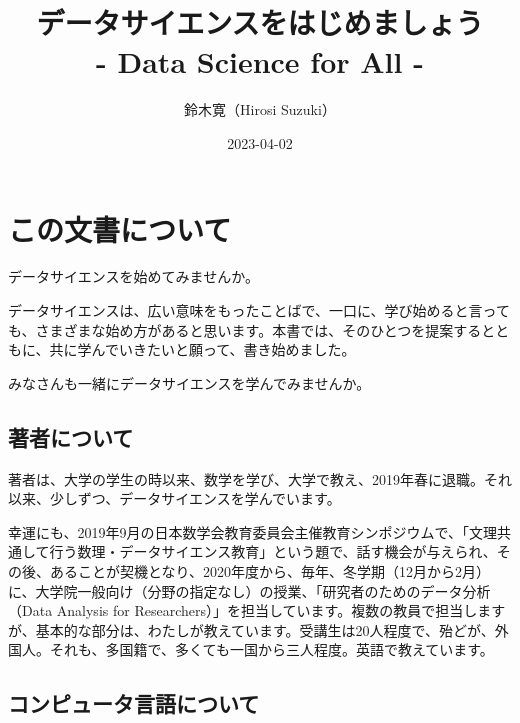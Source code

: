 \documentclass[
]{bxjsbook}
\title{データサイエンスをはじめましょう\\
- Data Science for All -}
\author{鈴木寛（Hirosi Suzuki）}
\date{2023-04-02}
\theoremstyle{definition}
\theoremstyle{definition}
\theoremstyle{definition}
\theoremstyle{definition}
\theoremstyle{remark}
\begin{document}
\maketitle

{
\setcounter{tocdepth}{2}
\tableofcontents
}
\hypertarget{ux3053ux306eux6587ux66f8ux306bux3064ux3044ux3066}{%
\section*{この文書について}\label{ux3053ux306eux6587ux66f8ux306bux3064ux3044ux3066}}

データサイエンスを始めてみませんか。

データサイエンスは、広い意味をもったことばで、一口に、学び始めると言っても、さまざまな始め方があると思います。本書では、そのひとつを提案するとともに、共に学んでいきたいと願って、書き始めました。

みなさんも一緒にデータサイエンスを学んでみませんか。

\hypertarget{ux8457ux8005ux306bux3064ux3044ux3066}{%
\subsection*{著者について}\label{ux8457ux8005ux306bux3064ux3044ux3066}}

著者は、大学の学生の時以来、数学を学び、大学で教え、2019年春に退職。それ以来、少しずつ、データサイエンスを学んでいます。

幸運にも、2019年9月の日本数学会教育委員会主催教育シンポジウムで、「文理共通して行う数理・データサイエンス教育」という題で、話す機会が与えられ、その後、あることが契機となり、2020年度から、毎年、冬学期（12月から2月）に、大学院一般向け（分野の指定なし）の授業、「研究者のためのデータ分析（Data Analysis for Researchers）」を担当しています。複数の教員で担当しますが、基本的な部分は、わたしが教えています。受講生は20人程度で、殆どが、外国人。それも、多国籍で、多くても一国から三人程度。英語で教えています。

\hypertarget{ux30b3ux30f3ux30d4ux30e5ux30fcux30bfux8a00ux8a9eux306bux3064ux3044ux3066}{%
\subsection*{コンピュータ言語について}\label{ux30b3ux30f3ux30d4ux30e5ux30fcux30bfux8a00ux8a9eux306bux3064ux3044ux3066}}
\end{document}
